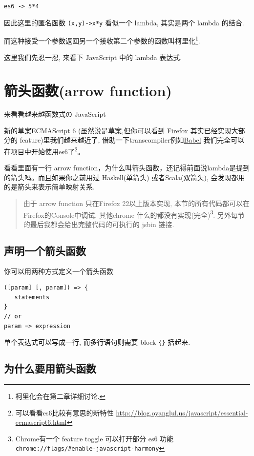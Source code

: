 \documentclass[a5paper]{book}
\begin{document}
\begin{verbatim}
es6 -> 5*4
\end{verbatim}

因此这里的匿名函数 \texttt{(x,y)->x*y} 看似一个 lambda, 其实是两个 lambda
的结合.

而这种接受一个参数返回另一个接收第二个参数的函数叫柯里化\footnote{柯里化会在第二章详细讨论.}.

这里我们先忍一忍, 来看下 JavaScript 中的 lambda 表达式.
\chapter{箭头函数(arrow function)}
\label{sec:orgheadline5}

来看看越来越函数式の JavaScript

新的草案\href{http://kangax.github.io/compat-table/es6/}{ECMAScript 6}
(虽然说是草案,但你可以看到 Firefox 其实已经实现大部分的
feature)里我们越来越近了, 借助一下transcompiler例如\href{https://babeljs.io}{Babel} 我们完全可以在项目中开始使用es6了\footnote{可以看看es6比较有意思的新特性 \url{http://blog.oyanglul.us/javascript/essential-ecmascript6.html}}。

看看里面有一行 arrow
function，为什么叫箭头函数，还记得前面说lambda是提到的箭头吗。而且如果你之前用过
Haskell(单箭头) 或者Scala(双箭头), 会发现都用的是箭头来表示简单映射关系.

\begin{quote}
由于 arrow function 只在Firefox 22以上版本实现,
本节的所有代码都可以在Firefox的Console中调试, 其他chrome 什么的都没有实现(完全)\footnote{Chrome有一个 feature toggle 可以打开部分 es6 功能 \texttt{chrome://flags/\#enable-javascript-harmony}}.
另外每节的最后我都会给出完整代码的可执行的 jsbin 链接.
\end{quote}

\section{声明一个箭头函数}
\label{sec:orgheadline2}

你可以用两种方式定义一个箭头函数

\begin{verbatim}
([param] [, param]) => {
   statements
}
// or
param => expression
\end{verbatim}

单个表达式可以写成一行, 而多行语句则需要 block \texttt{\{\}} 括起来.

\section{为什么要用箭头函数}
\label{sec:orgheadline3}
\end{document}
